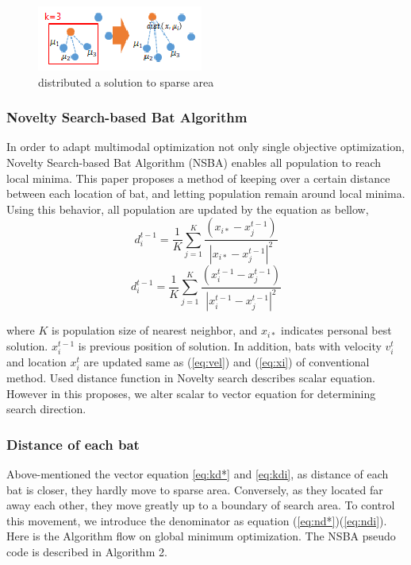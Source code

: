\documentclass{ies2018}
\begin{document}
\begin{figure}[h]
\begin{center}
\includegraphics[width=1.0\linewidth]{eps/n_dist.eps}
\end{center}
\caption{distributed a solution to sparse area}
\label{fig:n_dist}
\end{figure}

\subsubsection{Novelty Search-based Bat Algorithm}
In order to adapt multimodal optimization not only single objective optimization, Novelty Search-based Bat Algorithm (NSBA) enables all population to reach local minima. This paper proposes a method of keeping over a certain distance between each location of bat, and letting population remain around local minima. Using this behavior, all population are updated by the equation as bellow, 
\begin{equation}
d_i^{t-1} = \frac {1}{K} \sum _{j=1}^K \frac {(x_{i*}-x_j^{t-1})}{|x_{i*}-x_j^{t-1}|^2}
\label{eq:nd*}
\end{equation}
\begin{equation}
d_i^{t-1}=\frac{1}{K}\sum_{j=1}^K \frac{(x_i^{t-1}-x_j^{t-1})}{|x_i^{t-1}-x_j^{t-1}|^2}
\label{eq:ndi}
\end{equation}

where ${K}$ is population size of nearest neighbor, and ${x_{i*}}$ indicates personal best solution. ${x_i^{t-1}}$ is previous position of solution. In addition, bats with velocity ${v_i^t}$ and location ${x_i^t}$ are updated same as (\ref{eq:vel}) and (\ref{eq:xi}) of conventional method. Used distance function in Novelty search describes scalar equation. However in this proposes, we alter scalar to vector equation for determining search direction. 

 \subsubsection{Distance of each bat} 
 Above-mentioned the vector equation \ref{eq:kd*} and \ref{eq:kdi}, as distance of each bat is closer, they hardly move to sparse area. Conversely, as they located far away each other, they move greatly up to a boundary of search area. To control this movement, we introduce the denominator as equation (\ref{eq:nd*})(\ref{eq:ndi}). Here is the Algorithm flow on global minimum optimization. The NSBA pseudo code is described in Algorithm 2.
\end{document}
